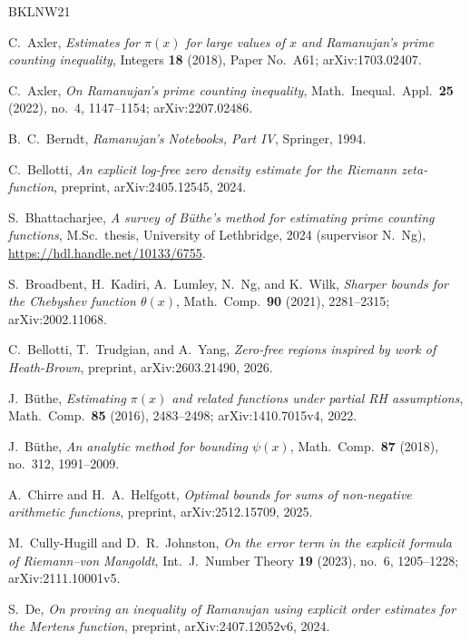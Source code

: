\documentclass{amsart}
\theoremstyle{definition}
\theoremstyle{remark}
\theoremstyle{plain}
\numberwithin{equation}{section}
\begin{document}
\begin{thebibliography}{BKLNW21}

C.~Axler, \emph{Estimates for $\pi(x)$ for large values of $x$ and Ramanujan's prime counting inequality}, Integers \textbf{18} (2018), Paper No.~A61; arXiv:1703.02407.

C.~Axler, \emph{On Ramanujan's prime counting inequality}, Math.\ Inequal.\ Appl.\ \textbf{25} (2022), no.~4, 1147--1154; arXiv:2207.02486.

B.~C.~Berndt, \emph{Ramanujan's Notebooks, Part IV}, Springer, 1994.

C.~Bellotti, \emph{An explicit log-free zero density estimate for the Riemann zeta-function}, preprint, arXiv:2405.12545, 2024.

S.~Bhattacharjee, \emph{A survey of B\"uthe's method for estimating prime counting functions}, M.Sc.\ thesis, University of Lethbridge, 2024 (supervisor N.~Ng), \url{https://hdl.handle.net/10133/6755}.

S.~Broadbent, H.~Kadiri, A.~Lumley, N.~Ng, and K.~Wilk, \emph{Sharper bounds for the Chebyshev function $\theta(x)$}, Math.\ Comp.\ \textbf{90} (2021), 2281--2315; arXiv:2002.11068.

C.~Bellotti, T.~Trudgian, and A.~Yang, \emph{Zero-free regions inspired by work of Heath-Brown}, preprint, arXiv:2603.21490, 2026.

J.~B\"uthe, \emph{Estimating $\pi(x)$ and related functions under partial RH assumptions}, Math.\ Comp.\ \textbf{85} (2016), 2483--2498; arXiv:1410.7015v4, 2022.

J.~B\"uthe, \emph{An analytic method for bounding $\psi(x)$}, Math.\ Comp.\ \textbf{87} (2018), no.~312, 1991--2009.

A.~Chirre and H.~A.~Helfgott, \emph{Optimal bounds for sums of non-negative arithmetic functions}, preprint, arXiv:2512.15709, 2025.

M.~Cully-Hugill and D.~R.~Johnston, \emph{On the error term in the explicit formula of Riemann--von Mangoldt}, Int.\ J.\ Number Theory \textbf{19} (2023), no.~6, 1205--1228; arXiv:2111.10001v5.

S.~De, \emph{On proving an inequality of Ramanujan using explicit order estimates for the Mertens function}, preprint, arXiv:2407.12052v6, 2024.


\end{thebibliography}
\end{document}
